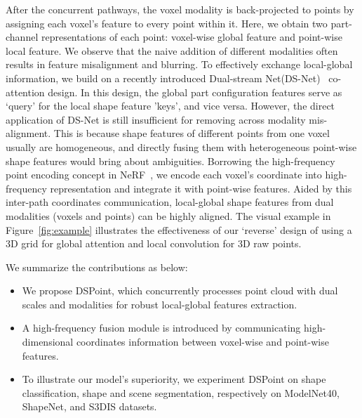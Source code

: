 \documentclass[sigconf]{acmart}
\begin{document}
After the concurrent pathways, the voxel modality is back-projected to points by assigning each voxel's feature to every point within it.  Here, we obtain two part-channel representations of each point: voxel-wise global feature and point-wise local feature.   We observe that the naive addition of different modalities often results in feature misalignment and blurring.  To effectively exchange local-global information, we build on a recently introduced Dual-stream Net(DS-Net)~\cite{mao2021dual} co-attention design.  In this design, the global part configuration features serve as `query' for the local shape feature 'keys', and vice versa.  However, the direct application of DS-Net is still insufficient for removing across modality mis-alignment.   This is because shape features of different points from one voxel usually are homogeneous, and directly fusing them with heterogeneous point-wise shape features would bring about ambiguities.   Borrowing the high-frequency point encoding concept in NeRF~\cite{mildenhall2020nerf}, we encode each voxel's coordinate into high-frequency representation and integrate it with point-wise features.  Aided by this inter-path coordinates communication, local-global shape features from dual modalities (voxels and points) can be highly aligned.  
The visual example in Figure~\ref{fig:example} illustrates the effectiveness of our `reverse' design of using a 3D grid for global attention and local convolution for 3D raw points. 



















We summarize the contributions as below:

\begin{itemize}
    \item We propose DSPoint, which concurrently processes point cloud with dual scales and modalities for robust local-global features extraction.
    
    \item A high-frequency fusion module is introduced by communicating high-dimensional coordinates information between voxel-wise and point-wise features.
    
    \item To illustrate our model's superiority, we experiment DSPoint on shape classification, shape and scene segmentation, respectively on ModelNet40, ShapeNet, and S3DIS datasets.
\end{itemize}
\end{document}
